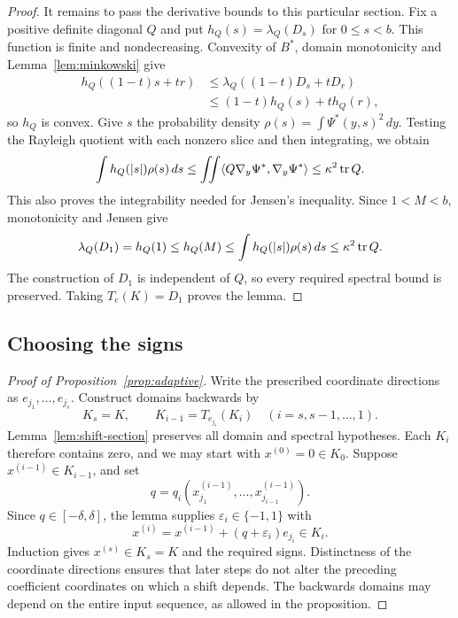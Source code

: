 \begin{proof}
It remains to pass the derivative bounds to this particular section.
Fix a positive definite diagonal $Q$ and put $h_Q(s)=\lambda_Q(D_s)$ for
$0\le s<b$. This function is finite and nondecreasing. Convexity of $B^*$,
domain monotonicity and Lemma~\ref{lem:minkowski} give
\[
 \begin{split}
 h_Q((1-t)s+tr)
 &\le\lambda_Q((1-t)D_s+tD_r)\\
 &\le(1-t)h_Q(s)+t h_Q(r),
 \end{split}
\]
so $h_Q$ is convex. Give $s$ the probability density
$\rho(s)=\int \Psi^*(y,s)^2\,dy$. Testing the Rayleigh quotient with each
nonzero slice and then integrating, we obtain
\[
 \int h_Q(|s|)\rho(s)\,ds
 \le\iint\langle Q\nabla_y\Psi^*,\nabla_y\Psi^*\rangle
 \le\kappa^2\operatorname{tr} Q.
\]
This also proves the integrability needed for Jensen's inequality. Since
$1<M<b$, monotonicity and Jensen give
\[
 \lambda_Q(D_1)=h_Q(1)\le h_Q(M)
 \le\int h_Q(|s|)\rho(s)\,ds\le\kappa^2\operatorname{tr} Q.
\]
The construction of $D_1$ is independent of $Q$, so every required spectral
bound is preserved. Taking $T_e(K)=D_1$ proves the lemma.
\end{proof}

\subsection{Choosing the signs}

\begin{proof}[Proof of Proposition~\ref{prop:adaptive}]
Write the prescribed coordinate directions as $e_{j_1},\ldots,e_{j_s}$.
Construct domains backwards by
\[
 K_s=K,\qquad K_{i-1}=T_{e_{j_i}}(K_i)
 \quad(i=s,s-1,\ldots,1).
\]
Lemma~\ref{lem:shift-section} preserves all domain and spectral hypotheses.
Each $K_i$ therefore contains zero, and we may start with $x^{(0)}=0\in K_0$.
Suppose $x^{(i-1)}\in K_{i-1}$, and set
\[
 q=q_i(x^{(i-1)}_{j_1},\ldots,x^{(i-1)}_{j_{i-1}}).
\]
Since $q\in[-\delta,\delta]$, the lemma supplies $\varepsilon_i\in\{-1,1\}$ with
\[
 x^{(i)}=x^{(i-1)}+(q+\varepsilon_i)e_{j_i}\in K_i.
\]
Induction gives $x^{(s)}\in K_s=K$ and the required signs. Distinctness of the
coordinate directions ensures that later steps do not alter the preceding
coefficient coordinates on which a shift depends. The backwards domains may
depend on the entire input sequence, as allowed in the proposition.
\end{proof}
